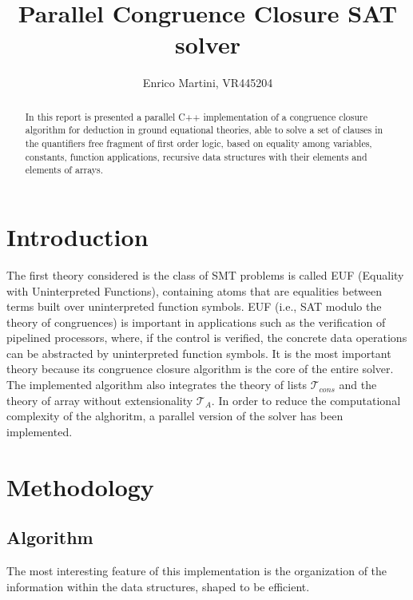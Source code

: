 \documentclass{IEEEtran}
\begin{document}
\title{Parallel Congruence Closure SAT solver}
\author{Enrico Martini, VR445204}
\maketitle
\begin{abstract}
 In this report is presented a parallel C++ implementation of a congruence closure algorithm for deduction in ground equational theories, able to solve a set of clauses in the quantifiers free fragment of first order logic, based on equality among variables, constants, function applications, recursive data structures with their elements and elements of arrays.
\end{abstract}
\section{Introduction}
The first theory considered is the class of SMT problems is called EUF (Equality with Uninterpreted Functions), containing atoms that are equalities between terms built over uninterpreted function symbols. EUF (i.e., SAT modulo the theory of congruences) is important in applications such as the verification of pipelined processors, where, if the control is verified, the concrete data operations can be abstracted by uninterpreted function symbols.\cite{NIEUWENHUIS2007557} It is the most important theory because its congruence closure algorithm is the core of the entire solver. The implemented algorithm also integrates the theory of lists $\mathcal{T}_{cons}$ and the theory of array without extensionality $\mathcal{T}_A$. In order to reduce the computational complexity of the alghoritm, a parallel version of the solver has been implemented.
\section{Methodology}
\subsection{Algorithm}
The most interesting feature of this implementation is the organization of the information within the data structures, shaped to be efficient.
\end{document}
